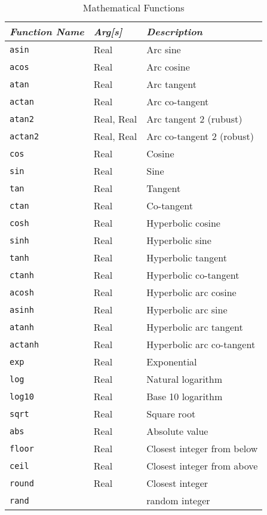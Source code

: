 \begin{table}
	\begin{center}
	\caption{Mathematical Functions}\label{tab:MATHP-FUNCTIONS}
	\begin{tabular}{lll}
		\hline
		\emph{Function Name} & \emph{Arg[s]} & \emph{Description} \\
		\hline
		\texttt{asin} & Real & Arc sine \\
		\texttt{acos} & Real & Arc cosine \\
		\texttt{atan} & Real & Arc tangent \\
		\texttt{actan} & Real & Arc co-tangent \\
		\texttt{atan2} & Real, Real & Arc tangent 2 (rubust) \\
		\texttt{actan2} & Real, Real & Arc co-tangent 2 (robust) \\
		\texttt{cos} & Real & Cosine \\
		\texttt{sin} & Real & Sine \\
		\texttt{tan} & Real & Tangent \\
		\texttt{ctan} & Real & Co-tangent \\
		\texttt{cosh} & Real & Hyperbolic cosine \\
		\texttt{sinh} & Real & Hyperbolic sine \\
		\texttt{tanh} & Real & Hyperbolic tangent \\
		\texttt{ctanh} & Real & Hyperbolic co-tangent \\
		\texttt{acosh} & Real & Hyperbolic arc cosine \\
		\texttt{asinh} & Real & Hyperbolic arc sine \\
		\texttt{atanh} & Real & Hyperbolic arc tangent \\
		\texttt{actanh} & Real & Hyperbolic arc co-tangent \\
		\texttt{exp} & Real & Exponential \\
		\texttt{log} & Real & Natural logarithm \\
		\texttt{log10} & Real & Base 10 logarithm \\
		\texttt{sqrt} & Real & Square root \\
		\texttt{abs} & Real & Absolute value \\
		\texttt{floor} & Real & Closest integer from below \\
		\texttt{ceil} & Real & Closest integer from above \\
		\texttt{round} & Real & Closest integer \\
		\texttt{rand} & & random integer 

\end{tabular}
\end{center}
\end{table}
